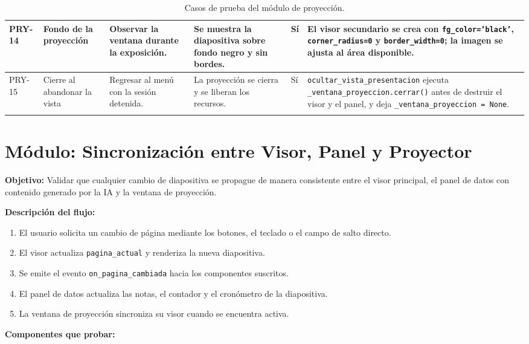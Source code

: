 \documentclass[12pt,letterpaper]{article}
\begin{document}
{\begin{longtable}{|L{1.1cm}|L{2.3cm}|L{3.2cm}|L{3.6cm}|L{1.2cm}|L{3.6cm}|}
PRY-14 & Fondo de la proyección & Observar la ventana durante la exposición. & Se muestra la diapositiva sobre fondo negro y sin bordes. & Sí & El visor secundario se crea con \texttt{fg\_color='black'}, \texttt{corner\_radius=0} y \texttt{border\_width=0}; la imagen se ajusta al área disponible. \\ \hline
PRY-15 & Cierre al abandonar la vista & Regresar al menú con la sesión detenida. & La proyección se cierra y se liberan los recursos. & Sí & \texttt{ocultar\_vista\_presentacion} ejecuta \texttt{\_ventana\_proyeccion.cerrar()} antes de destruir el visor y el panel, y deja \texttt{\_ventana\_proyeccion = None}. \\ \hline
\caption{Casos de prueba del módulo de proyección.}
\label{tab:casos-prueba-modulo-proyeccion}
\end{longtable}
}

\clearpage
\section*{Módulo: Sincronización entre Visor, Panel y Proyector}

\textbf{Objetivo:} Validar que cualquier cambio de diapositiva se propague de manera consistente entre el visor principal, el panel de datos con contenido generado por la IA y la ventana de proyección.

\textbf{Descripción del flujo:}
\begin{enumerate}
    \item El usuario solicita un cambio de página mediante los botones, el teclado o el campo de salto directo.
    \item El visor actualiza \texttt{pagina\_actual} y renderiza la nueva diapositiva.
    \item Se emite el evento \texttt{on\_pagina\_cambiada} hacia los componentes suscritos.
    \item El panel de datos actualiza las notas, el contador y el cronómetro de la diapositiva.
    \item La ventana de proyección sincroniza su visor cuando se encuentra activa.
\end{enumerate}

\textbf{Componentes que probar:}
\end{document}
